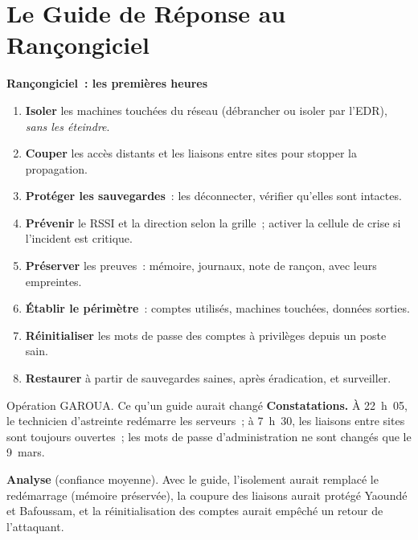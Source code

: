 \section{Le Guide de Réponse au Rançongiciel}
\label{sec:c22-guide}

\begin{boxprocedure}
\textbf{Rançongiciel~: les premières heures}
\begin{enumerate}
    \item \textbf{Isoler} les machines touchées du réseau (débrancher ou
          isoler par l'EDR), \emph{sans les éteindre}.
    \item \textbf{Couper} les accès distants et les liaisons entre sites
          pour stopper la propagation.
    \item \textbf{Protéger les sauvegardes}~: les déconnecter, vérifier
          qu'elles sont intactes.
    \item \textbf{Prévenir} le RSSI et la direction selon la grille~;
          activer la cellule de crise si l'incident est critique.
    \item \textbf{Préserver} les preuves~: mémoire, journaux, note de rançon,
          avec leurs empreintes.
    \item \textbf{Établir le périmètre}~: comptes utilisés, machines
          touchées, données sorties.
    \item \textbf{Réinitialiser} les mots de passe des comptes à privilèges
          depuis un poste sain.
    \item \textbf{Restaurer} à partir de sauvegardes saines, après
          éradication, et surveiller.
\end{enumerate}
\end{boxprocedure}

\begin{boxscenario}{Opération GAROUA. Ce qu'un guide aurait changé}
\textbf{Constatations.} À 22~h~05, le technicien d'astreinte redémarre les
serveurs~; à 7~h~30, les liaisons entre sites sont toujours ouvertes~; les
mots de passe d'administration ne sont changés que le 9~mars.

\medskip
\textbf{Analyse} (confiance moyenne). Avec le guide, l'isolement aurait
remplacé le redémarrage (mémoire préservée), la coupure des liaisons aurait
protégé Yaoundé et Bafoussam, et la réinitialisation des comptes aurait
empêché un retour de l'attaquant.
\end{boxscenario}

